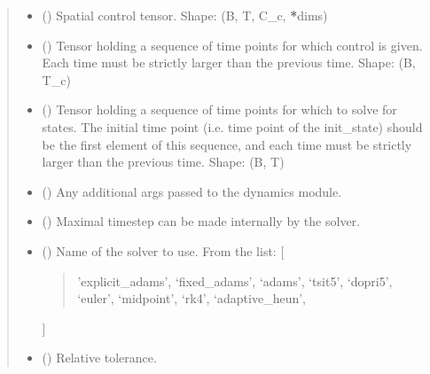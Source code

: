 \documentclass[letterpaper,10pt,english]{sphinxmanual}
\begin{document}
\begin{fulllineitems}
\begin{fulllineitems}
\begin{quote}
\begin{description}
\begin{itemize}
\item {} 
 () \textendash{} Spatial control tensor. Shape: (B, T, C\_c, {\color{red}\bfseries{}*}dims)

\item {} 
 () \textendash{} Tensor holding a sequence of time points for which control is given.
Each time must be strictly larger than the previous time. Shape: (B, T\_c)

\item {} 
 () \textendash{} Tensor holding a sequence of time points for which to solve for states.
The initial time point (i.e. time point of the init\_state) should be the first
element of this sequence, and each time must be strictly larger than the previous time.
Shape: (B, T)

\item {} 
 () \textendash{} Any additional args passed to the dynamics module.

\item {} 
 () \textendash{} Maximal timestep can be made internally by the solver.

\item {} 
 () \textendash{} 
Name of the solver to use. From the list:
{[}
\begin{quote}

’explicit\_adams’,
‘fixed\_adams’,
‘adams’,
‘tsit5’,
‘dopri5’,
‘euler’,
‘midpoint’,
‘rk4’,
‘adaptive\_heun’,
\end{quote}

{]}


\item {} 
 () \textendash{} Relative tolerance.


\end{itemize}
\end{description}
\end{quote}
\end{fulllineitems}
\end{fulllineitems}
\end{document}
